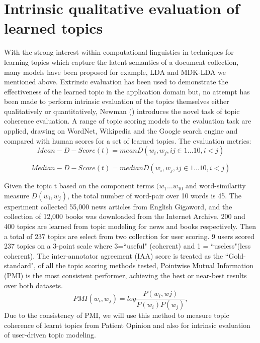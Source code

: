 \documentclass[11pt,twoside]{report}
\begin{document}
\section{Intrinsic qualitative evaluation of learned topics}
With the strong interest within computational linguistics in techniques for learning topics which capture the latent semantics of a document collection, many models have been proposed for example, LDA and MDK-LDA we mentioned above. Extrinsic evaluation has been used to demonstrate the effectiveness of the learned topic in the application domain but, no attempt has been made to perform intrinsic evaluation of the topics themselves either qualitatively or quantitatively, Newman (\cite{ref27}) introduces the novel task of topic coherence evaluation. A range of topic scoring models to the evaluation task are applied, drawing on WordNet, Wikipedia and the Google search engine and compared with human scores for a set of learned topics. The evaluation metrics:
\begin{equation}
Mean-D-Score(t) =  mean{D(w_{i}, w_{j}, ij\in 1…10, i<j)}
\end{equation}

\begin{equation}
Median-D-Score(t) =  median{D(w_{i}, w_{j}, ij\in 1…10, i<j)}
\end{equation}

Given the topic t based on the component terms $(w_{1}…w_{10}$ and word-similarity measure $D(w_{i}, w_{j})$, the total number of word-pair over 10 words is 45. The experiment collected 55,000 news articles from English Gigaword, and the collection of 12,000 books was downloaded from the Internet Archive. 200 and 400 topics are learned from topic modeling for news and books respectively. Then a total of 237 topics are select from two collection for user scoring. 9 users scored 237 topics on a 3-point scale where 3=``useful" (coherent) and 1 = ``useless"(less coherent). The inter-annotator agreement (IAA) score is treated as the ``Gold-standard", of all the topic scoring methods tested, Pointwise Mutual Information (PMI) is the most consistent performer, achieving the best or near-best results over both datasets. 
\begin{equation}
PMI(w_{i}, w_{j}) = log \frac{P(w_{i}, w{j})}{P(w_{i})P(w_{j})},
\end{equation}
Due to the consistency of PMI, we will use this method to measure topic coherence of learnt topics from Patient Opinion and also for intrinsic evaluation of user-driven topic modeling.
\end{document}
